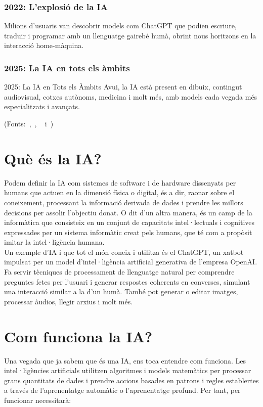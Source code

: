\begin{enumerate}
        \subsubsection{2022: L'explosió de la IA}
         Milions d’usuaris van descobrir models com ChatGPT que podien escriure, traduir i programar amb un llenguatge gairebé humà, obrint nous horitzons en la interacció home-màquina.
        \subsubsection{2025: La IA en tots els àmbits}
        2025: La IA en Tots els Àmbits
        Avui, la IA està present en dibuix, contingut audiovisual, cotxes autònoms, medicina i molt més, amb models cada vegada més especialitzats i avançats.

\end{enumerate}

(Fonts:~\cite{McCarthy_Minsky_Rochester_Shannon_2006},~\cite{deepblue},
~\cite{chatGPT2022} i~\cite{10.1093/mind/LIX.236.433})


\section{Què és la IA?}
Podem definir la IA com sistemes de software i de hardware dissenyats per humans que actuen en la dimensió física o digital, és a dir, raonar sobre el coneixement, processant la informació derivada de dades i prendre les millors decisions per assolir l'objectiu donat. O dit d'un altra manera, és un camp de la informàtica que consisteix en un conjunt de capacitats intel·lectuals i cognitives expressades per un sistema informàtic creat pels humans, que té com a propòsit imitar la intel·ligència humana. \\

Un exemple d'IA i que tot el món coneix i utilitza és el ChatGPT, un xatbot impulsat per un model d'intel·ligència artificial generativa de l'empresa OpenAI. Fa servir tècniques de processament de llenguatge natural per comprendre preguntes fetes per l'usuari i generar respostes coherents en converses, simulant una interacció similar a la d'un humà. També pot generar o editar imatges, processar àudios, llegir arxius i molt més.

\section{Com funciona la IA?}
Una vegada que ja sabem que és una IA, ens toca entendre com funciona.
Les intel·ligències artificials utilitzen algoritmes i models matemàtics per processar grans quantitats de dades
i prendre accions basades en patrons i regles establertes a través de l'aprenentatge automàtic o l'aprenentatge profund.
Per tant, per funcionar necessitarà:

